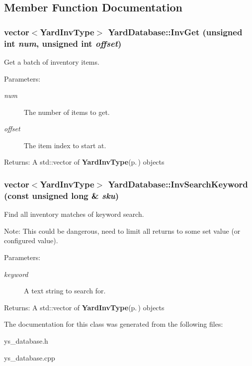 \subsection{Member Function Documentation}
\subsubsection{\setlength{\rightskip}{0pt plus 5cm}vector$<${\bf Yard\-Inv\-Type}$>$ Yard\-Database::Inv\-Get (unsigned int {\em num}, unsigned int {\em offset})}\label{classYardDatabase_a4}


Get a batch of inventory items. 

\begin{Desc}
\item[Parameters:]
\begin{description}
\item[{\em num}]The number of items to get. \item[{\em offset}]The item index to start at. \end{description}
\end{Desc}
\begin{Desc}
\item[Returns:]A std::vector of {\bf Yard\-Inv\-Type}{\rm (p.\,\pageref{classYardInvType})} objects \end{Desc}
\subsubsection{\setlength{\rightskip}{0pt plus 5cm}vector$<${\bf Yard\-Inv\-Type}$>$ Yard\-Database::Inv\-Search\-Keyword (const unsigned long \& {\em sku})}\label{classYardDatabase_a3}


Find all inventory matches of keyword search. 

\begin{Desc}
\item[Note:]This could be dangerous, need to limit all returns to some set value (or configured value). \end{Desc}
\begin{Desc}
\item[Parameters:]
\begin{description}
\item[{\em keyword}]A text string to search for. \end{description}
\end{Desc}
\begin{Desc}
\item[Returns:]A std::vector of {\bf Yard\-Inv\-Type}{\rm (p.\,\pageref{classYardInvType})} objects \end{Desc}


The documentation for this class was generated from the following files:\begin{CompactItemize}
\item 
ys\_\-database.h\item 
ys\_\-database.cpp\end{CompactItemize}
